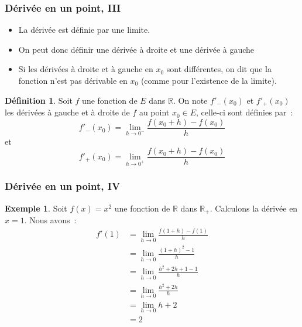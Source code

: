 \documentclass[10pt,notheorems]{beamer}
\theoremstyle{plain}
\theoremstyle{definition} %
\newtheorem{definition}{Définition}
\newtheorem{example}{Exemple}
\begin{document}
\begin{frame}
  \frametitle{Dérivée en un point, III}
  \hypertarget{slide_derivee_3}{}

  \begin{itemize}

  \item La dérivée est définie par une limite.\newline

  \item On peut donc définir une dérivée à droite et une dérivée à gauche\newline

  \item Si les dérivées à droite et à gauche en $x_0$ sont différentes, on dit que la fonction n'est pas dérivable en $x_0$ (comme pour l'existence de la limite).\newline

  \end{itemize}

  \begin{definition}
    Soit $f$ une fonction de $E$ dans $\mathbb R$. On note $f'_-(x_0)$ et $f'_+(x_0)$  les dérivées à gauche et à droite de $f$ au point $x_0\in E$, celle-ci sont définies par~:
    \[
      f'_-(x_0) = \lim_{h\rightarrow 0^-} \frac{f(x_0+h)-f(x_0)}{h}
    \]
    et
    \[
      f'_+(x_0) = \lim_{h\rightarrow 0^+} \frac{f(x_0+h)-f(x_0)}{h}
    \]
  \end{definition}

\end{frame}


\begin{frame}
  \frametitle{Dérivée en un point, IV}
  \hypertarget{slide_derivee_4}{}

  \begin{example}

    Soit $f(x) = x^2$ une fonction de $\mathbb R$ dans $\mathbb R_+$. Calculons la dérivée en $x=1$. Nous avons~:
    \[
      \begin{split}
        f'(1) &= \lim_{h\rightarrow 0}\frac{f(1+h)-f(1)}{h}\\
        &= \lim_{h\rightarrow 0}\frac{(1+h)^2-1}{h}\\
        &= \lim_{h\rightarrow 0}\frac{h^2+2h+1-1}{h}\\
        &= \lim_{h\rightarrow 0}\frac{h^2+2h}{h}\\
        &= \lim_{h\rightarrow 0}h+2\\
        &= 2
      \end{split}
    \]
  \end{example}

\end{frame}
\end{document}
